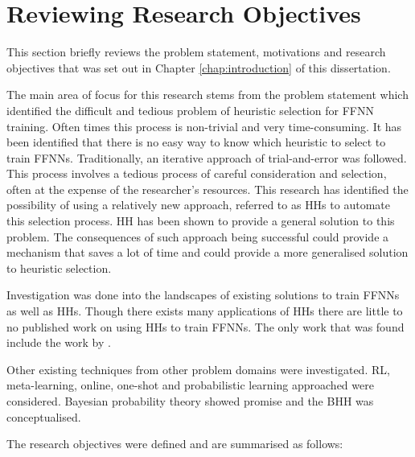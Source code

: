 \section{Reviewing Research Objectives}
\label{sec:conclusion:research_goals}

This section briefly reviews the problem statement, motivations and research objectives that was set out in Chapter \ref{chap:introduction} of this dissertation.

The main area of focus for this research stems from the problem statement which identified the difficult and tedious problem of heuristic selection for \ac{FFNN} training. Often times this process is non-trivial and very time-consuming. It has been identified that there is no easy way to know which heuristic to select to train \acp{FFNN}. Traditionally, an iterative approach of trial-and-error was followed. This process involves a tedious process of careful consideration and selection, often at the expense of the researcher's resources.  This research has identified the possibility of using a relatively new approach, referred to as \acp{HH} to automate this selection process. \ac{HH} has been shown to provide a general solution to this problem. The consequences of such approach being successful could provide a mechanism that saves a lot of time and could provide a more generalised solution to heuristic selection.

Investigation was done into the landscapes of existing solutions to train \acp{FFNN} as well as \acp{HH}. Though there exists many applications of \acp{HH} there are little to no published work on using \acp{HH} to train \acp{FFNN}. The only work that was found include the work by \citeauthor{ref:nel:2021} \cite{ref:nel:2021}.

Other existing techniques from other problem domains were investigated. \ac{RL}, meta-learning, online, one-shot and probabilistic learning approached were considered. Bayesian probability theory showed promise and the \Ac{BHH} was conceptualised.

The research objectives were defined and are summarised as follows:


